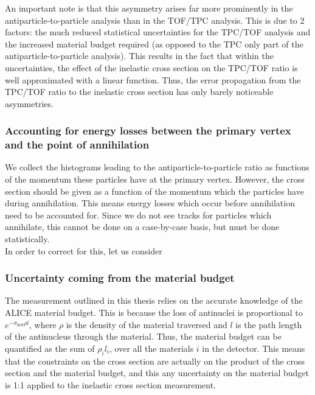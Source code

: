 An important note is that this asymmetry arises far more prominently in the antiparticle-to-particle analysis than in the TOF/TPC analysis. This is due to 2 factors: the much reduced statistical uncertainties for the TPC/TOF analysis and the increased material budget required (as opposed to the TPC only part of the antiparticle-to-particle analysis). This results in the fact that within the uncertainties, the effect of the inelastic cross section on the TPC/TOF ratio is well approximated with a linear function. Thus, the error propagation from the TPC/TOF ratio to the inelastic cross section has only barely noticeable asymmetries. 

\subsubsection{Accounting for energy losses between the primary vertex and the point of annihilation}
We collect the histograms leading to the antiparticle-to-particle ratio as functions of the momentum these particles have at the primary vertex. However, the cross section should be given as a function of the momentum which the particles have during annihilation. This means energy losses which occur before annihilation need to be accounted for. Since we do not see tracks for particles which annihilate, this cannot be done on a case-by-case basis, but must be done statistically.\\

In order to correct for this, let us consider 
\subsubsection{Uncertainty coming from the material budget}
The measurement outlined in this thesis relies on the accurate knowledge of the ALICE material budget. This is because the loss of antinuclei is proportional to $e^{-\sigma_\mathrm{inel} \rho l}$, where $\rho$ is the density of the material traversed and $l$ is the path length of the antinucleus through the material. Thus, the material budget can be quantified as the sum of $\rho_i l_i$, over all the materials $i$ in the detector. This means that the constraints on the cross section are actually on the product of the cross section and the material budget, and this any uncertainty on the material budget is 1:1 applied to the inelastic cross section measurement. \\

